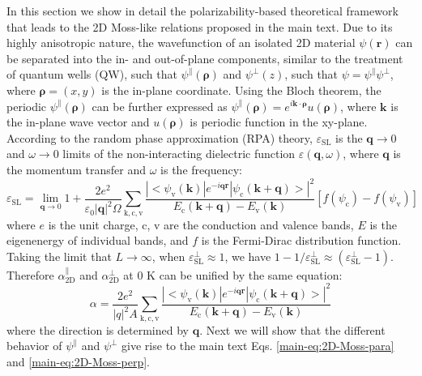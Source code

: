 \documentclass[manuscript=suppinfo,email=true,hyperref=true,keywords=false]{achemso}
\begin{document}
In this section we show in detail the polarizability-based theoretical
framework that leads to the 2D Moss-like relations proposed in the
main text.  Due to its highly anisotropic nature, the wavefunction of
an isolated 2D material $\psi(\mathbf{r})$ can be separated into the
in- and out-of-plane components, similar to the treatment of quantum
wells (QW),\cite{davies_physics_1997} such that
$\psi^{\parallel}(\boldsymbol{\rho})$ and $\psi^{\perp}(z)$, such that
$\psi=\psi^{\parallel}\psi^{\perp}$, where $\boldsymbol{\rho}=(x, y)$
is the in-plane coordinate. Using the Bloch theorem, the periodic
$\psi^{\parallel}(\boldsymbol{\rho})$ can be further expressed as
$\psi^{\parallel}(\boldsymbol{\rho})=e^{i\mathbf{k} \cdot
  \boldsymbol{\rho}}u(\boldsymbol{\rho})$, where $\mathbf{k}$ is the
in-plane wave vector and $u(\boldsymbol{\rho})$ is periodic function
in the xy-plane. According to the random phase approximation (RPA)
theory\cite{Adler_1962}, $\varepsilon_{\mathrm{SL}}$ is the
$\mathbf{q} \to 0$ and $\omega \to 0$ limits of the non-interacting
dielectric function $\varepsilon(\mathbf{q}, \omega)$, where
$\mathbf{q}$ is the momentum transfer and $\omega$ is the frequency:
\begin{equation}
  \label{eq:RPA-eps2}
  \varepsilon_{\mathrm{SL}}
  = \lim_{\mathbf{q} \to 0} 1 + \frac{2e^{2}}{\varepsilon_{0} |\mathbf{q}|^{2} \Omega}
  \sum_{\mathrm{k, c, v}}
  \frac{|<\psi_{\mathrm{v}}(\mathbf{k})|e^{-i\mathbf{q}\mathbf{r}}|\psi_{\mathrm{c}}(\mathbf{k+q})>|^{2}}
  {E_{\mathrm{c}}(\mathbf{k+q}) - E_{\mathrm{v}}(\mathbf{k})}
  \left[f(\psi_{\mathrm{c}}) - f(\psi_{\mathrm{v}})\right]
\end{equation}
where $e$ is the unit charge, c, v are the conduction and valence
bands, $E$ is the eigenenergy of individual bands, and $f$ is the
Fermi-Dirac distribution function. Taking the
limit that $L\to\infty$, when
$\varepsilon^{\perp}_{\mathrm{SL}} \approx 1$, we have
$1-1/\varepsilon^{\perp}_{\mathrm{SL}} \approx
(\varepsilon_{\mathrm{SL}}^{\perp} - 1)$. Therefore
$\alpha_{\mathrm{2D}}^{\parallel}$ and $\alpha_{\mathrm{2D}}^{\perp}$
at 0 K can be unified by the same equation:
\begin{equation}
  \label{eq:alpha-RPA}
  \alpha = \frac{2e^{2}}{|q|^{2}A} \sum_{\mathrm{k,c,v}}
  \frac{|<\psi_{\mathrm{v}}(\mathbf{k})|e^{-i\mathbf{q}\mathbf{r}}|\psi_{\mathrm{c}}(\mathbf{k+q})>|^{2}}
  {E_{\mathrm{c}}(\mathbf{k+q}) - E_{\mathrm{v}}(\mathbf{k})}
\end{equation}
where the direction is determined by $\mathbf{q}$. Next we will show
that the different behavior of $\psi^{\parallel}$ and $\psi^{\perp}$
give rise to the main text Eqs. \ref{main-eq:2D-Moss-para} and
\ref{main-eq:2D-Moss-perp}.
\end{document}

